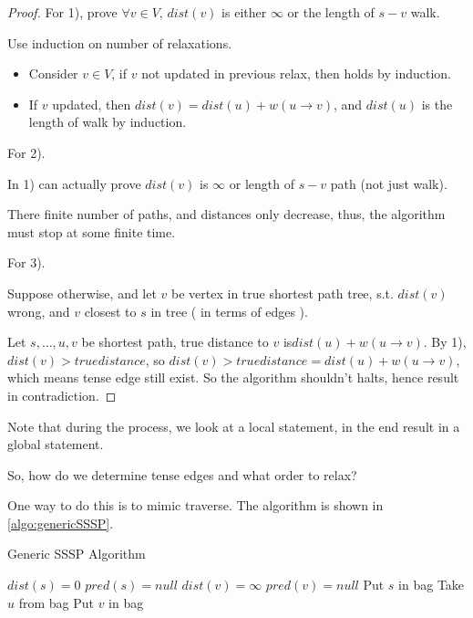 \begin{proof}
    For 1), prove $\forall v \in V$, $dist(v)$ is either $\infty$ or the length of $s-v$ walk.

    Use induction on number of relaxations.
    \begin{itemize}
        \item Consider $v \in V$, if $v$ not updated in previous relax,
            then holds by induction.
        \item If $v$ updated, then $dist(v) = dist(u) + w(u \rightarrow v)$,
            and $dist(u)$ is the length of walk by induction.
    \end{itemize}

    For 2).

    In 1) can actually prove $dist(v)$ is $\infty$ or length of $s-v$ path (not just walk).

    There finite number of paths, and distances only decrease,
    thus, the algorithm must stop at some finite time.

    For 3).

    Suppose otherwise, and let $v$ be vertex in true shortest path tree,
    s.t. $dist(v)$ wrong, and $v$ closest to $s$ in tree ( in terms of edges ).

    Let $s, \ldots ,u,v$ be shortest path, true distance to $v$ is$dist(u) + w(u \rightarrow v)$.
    By 1), $dist(v) > true distance$, so $dist(v) > true distance = dist(u) + w(u \rightarrow v)$,
    which means tense edge still exist. So the algorithm shouldn't halts,
    hence result in contradiction.
\end{proof}

Note that during the process, we look at a local statement,
in the end result in a global statement.

So, how do we determine tense edges and what order to relax?

One way to do this is to mimic traverse.
The algorithm is shown in \cref{algo:genericSSSP}.

\begin{algorithm}[H]
    \caption{Generic SSSP Algorithm}\label{algo:genericSSSP}
    \begin{algorithmic}[1]
            \State $dist(s) = 0$
            \State $pred(s) = null$
                \State $dist(v) = \infty$
                \State $pred(v) = null$
            \EndFor
        \EndProcedure
            \State {}
            \State Put $s$ in bag
                \State Take $u$ from bag
                        \State {}
                        \State Put $v$ in bag
                    \EndIf
                \EndFor
            \EndWhile
        \EndProcedure
    \end{algorithmic}
\end{algorithm}


